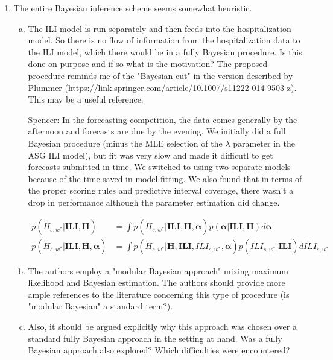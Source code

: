 \documentclass{article}
\newcommand{\spencer}[1]{{\color{blue} Spencer: #1}}
\begin{document}
\begin{enumerate}[1.]
\item The entire Bayesian inference scheme seems somewhat heuristic.

\begin{enumerate}[a.]
\item The ILI model is run separately and then feeds into the hospitalization model. So there is no
flow of information from the hospitalization data to the ILI model, which there would be in a fully
Bayesian procedure. Is this done on purpose and if so what is the motivation? The proposed
procedure reminds me of the "Bayesian cut" in the version described by Plummer
\href{(https://link.springer.com/article/10.1007/s11222-014-9503-z)}{(https://link.springer.com/article/10.1007/s11222-014-9503-z)}.
This may be a useful reference.

\spencer{In the forecasting competition, the data comes generally by the afternoon and
forecasts are due by the evening. We initially did a full Bayesian procedure
(minus the MLE selection of the $\lambda$ parameter in the ASG ILI model), but fit 
was very slow and made it difficutl to get forecasts submitted in time. We switched
to using two separate models because of the time saved in model fitting. We also
found that in terms of the proper scoring rules and predictive interval coverage,
there wasn't a drop in performance although the parameter estimation did 
change.

\begin{equation}
\begin{aligned}
    p(\tilde{H}_{s,w^*} | \textbf{ILI}, \textbf{H}) &= \int 
       p(\tilde{H}_{s,w^*} | \textbf{ILI}, \textbf{H}, \boldsymbol{\alpha}) 
       p(\boldsymbol{\alpha} | \textbf{ILI}, \textbf{H}) d\boldsymbol{\alpha} \\
    p(\tilde{H}_{s,w^*} | \textbf{ILI}, \textbf{H}, \boldsymbol{\alpha}) &= 
       \int p(\tilde{H}_{s,w^*} | \textbf{H}, \textbf{ILI}, 
       \widetilde{ILI}_{s,w^*}, \boldsymbol{\alpha}) 
       p(\widetilde{ILI}_{s,w^*} | \textbf{ILI}) d\widetilde{ILI}_{s,w^*}
\end{aligned}
\end{equation}
}

\item The authors employ a "modular Bayesian approach" mixing maximum likelihood and
Bayesian estimation. The authors should provide more ample references to the literature concerning
this type of procedure (is "modular Bayesian" a standard term?).
\item Also, it should be argued explicitly why this approach was chosen over a standard fully
Bayesian approach in the setting at hand. Was a fully Bayesian approach also explored? Which
difficulties were encountered?


\end{enumerate}
\end{enumerate}
\end{document}
